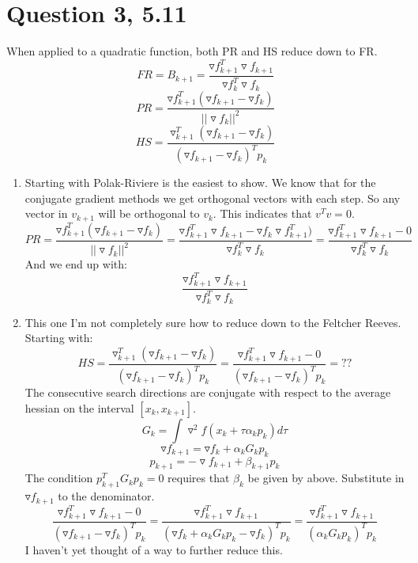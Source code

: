 \documentclass[7pt]{article}
\begin{document}
\section{Question 3, 5.11} 
When applied to a quadratic function, both PR and HS reduce down to FR. 
$$FR = B_{k+1} = \frac{\triangledown f_{k+1}^T \triangledown f_{k+1} }{\triangledown f_k^T\triangledown f_k}$$
$$ PR = \frac{\triangledown f_{k+1}^T(\triangledown f_{k+1}-\triangledown f_k)}{||\triangledown f_k||^2} $$
$$ HS = \frac{\triangledown_{k+1}^T(\triangledown f_{k+1} -\triangledown f_k)}{(\triangledown f_{k+1}-\triangledown f_k)^T p_k} $$
\begin{enumerate}
\item Starting with Polak-Riviere is the easiest to show. We know that for the conjugate gradient methods we get orthogonal vectors with each step. So any vector in $v_{k+1}$ will be orthogonal to $v_k$. This indicates that $v^Tv = 0$. 
$$ PR = \frac{\triangledown f_{k+1}^T(\triangledown f_{k+1}-\triangledown f_k)}{||\triangledown f_k||^2}  = 
 \frac{\triangledown f_{k+1}^T \triangledown f_{k+1} -\triangledown f_k \triangledown f_{k+1}^T )}{\triangledown f_k^T \triangledown f_k} =  \frac{\triangledown f_{k+1}^T \triangledown f_{k+1} -0 }{\triangledown f_k^T \triangledown f_k} $$
And we end up with: 
$$  \frac{\triangledown f_{k+1}^T \triangledown f_{k+1} }{\triangledown f_k^T\triangledown f_k} $$
\item This one I'm not completely sure how to reduce down to the Feltcher Reeves. Starting with: 
$$ HS = \frac{\triangledown_{k+1}^T(\triangledown f_{k+1} -\triangledown f_k)}{(\triangledown f_{k+1}-\triangledown f_k)^T p_k} = \frac{\triangledown f_{k+1}^T\triangledown f_{k+1} -0}{(\triangledown f_{k+1}-\triangledown f_k)^T p_k} = ? ? $$
The consecutive search directions are conjugate with respect to the average hessian on the interval $[x_k,x_{k+1}]$. 
$$G_k = \int \triangledown^2 f(x_k+\tau \alpha_k p_k)d\tau$$
$$ \triangledown f_{k+1} = \triangledown f_k +\alpha_k G_k p_k $$
$$ p_{k+1} = -\triangledown f_{k+1} +\beta_{k+1} p_k $$ 
The condition $p^T_{k+1} G_k p_k = 0$ requires that $\beta_k$ be given by above. Substitute in $\triangledown f_{k+1}$ to the denominator.
$$\frac{\triangledown f_{k+1}^T\triangledown f_{k+1} -0}{(\triangledown f_{k+1}-\triangledown f_k)^T p_k} = \frac{\triangledown f_{k+1}^T\triangledown f_{k+1}}{(\triangledown f_k +\alpha_k G_k p_k-\triangledown f_k)^T p_k} =
\frac{\triangledown f_{k+1}^T\triangledown f_{k+1}}{(\alpha_k G_k p_k)^T p_k}$$
I haven't yet thought of a way to further reduce this. 
\end{enumerate}
	
\end{document}
